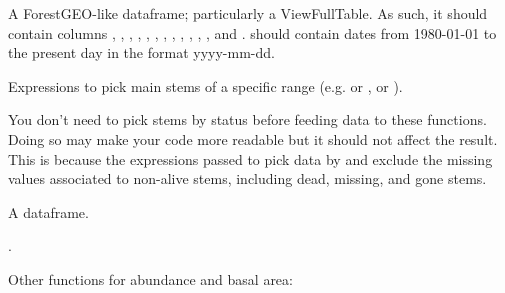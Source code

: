 \documentclass[a4paper]{book}
\begin{document}
\begin{Arguments}
\begin{ldescription}
\item[\code{vft}] A ForestGEO-like dataframe; particularly a ViewFullTable. As such,
it should contain columns , , , ,
, , , , , ,
, , and .  should contain dates from
1980-01-01 to the present day in the format yyyy-mm-dd.

\item[\code{...}] Expressions to pick main stems of a specific  range (e.g.
 or , or ).
\end{ldescription}
\end{Arguments}
%
\begin{Details}\relax
You don't need to pick stems by status before feeding data to these
functions. Doing so may make your code more readable but it should not affect
the result. This is because the expressions passed to  pick data by
 and exclude the missing  values associated to non-alive stems,
including dead, missing, and gone stems.
\end{Details}
%
\begin{Value}
A dataframe.
\end{Value}
%
\begin{SeeAlso}\relax
{}.

Other functions for abundance and basal area: 
\end{SeeAlso}
%
\end{document}
